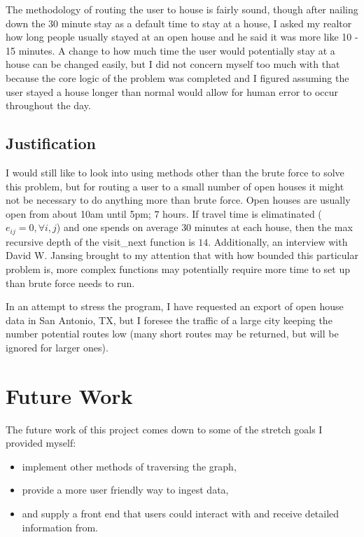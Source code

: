 \documentclass[letterpaper,11pt]{report}
\theoremstyle{definition}
\theoremstyle{definition}
\begin{document}
The methodology of routing the user to house is fairly sound, though after nailing down the 30 minute stay as a default time to stay at a house, I asked my realtor how long people usually stayed at an open house and he said it was more like 10 - 15 minutes. A change to how much time the user would potentially stay at a house can be changed easily, but I did not concern myself too much with that because the core logic of the problem was completed and I figured assuming the user stayed a house longer than normal would allow for human error to occur throughout the day.

\subsection{Justification}
I would still like to look into using methods other than the brute force to solve this problem, but for routing a user to a small number of open houses it might not be necessary to do anything more than brute force. Open houses are usually open from about 10am until 5pm; $7$ hours. If travel time is elimatinated ($e_{ij} = 0, \forall i,j$) and one spends on average $30$ minutes at each house, then the max recursive depth of the \textsf{visit\_next} function is $14$. Additionally, an interview with David W. Jansing brought to my attention that with how bounded this particular problem is, more complex functions may potentially require more time to set up than brute force needs to run\cite{jansing_jansing_2019}.

In an attempt to stress the program, I have requested an export of open house data in San Antonio, TX, but I foresee the traffic of a large city keeping the number potential routes low (many short routes may be returned, but will be ignored for larger ones).

\section{Future Work}
\hspace*{-2.5em} The future work of this project comes down to some of the stretch goals I provided myself:
\begin{itemize}
  \item implement other methods of traversing the graph,
  \item provide a more user friendly way to ingest data,
  \item and supply a front end that users could interact with and receive detailed information from.
\end{itemize}
\end{document}
